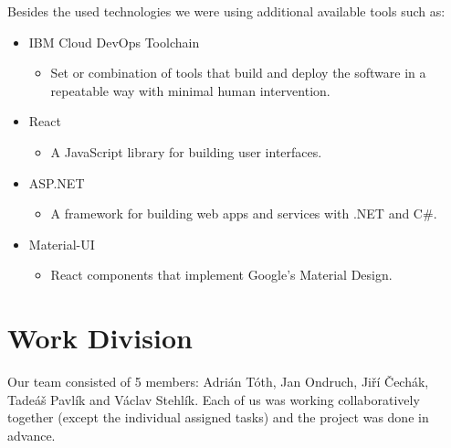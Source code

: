 \documentclass[11pt,a4paper]{article}
\begin{document}
Besides the used technologies we were using additional available tools such as:
\begin{itemize}
    \item IBM Cloud DevOps Toolchain
    \begin{itemize}
        \item Set or combination of tools that build and deploy the software in a repeatable way with minimal human intervention.
    \end{itemize}

    \item React
    \begin{itemize}
        \item A JavaScript library for building user interfaces.
    \end{itemize}

    \item ASP.NET
    \begin{itemize}
        \item A framework for building web apps and services with .NET and C\#.
    \end{itemize}

    \item Material-UI
    \begin{itemize}
        \item React components that implement Google's Material Design.
    \end{itemize}
\end{itemize}

\section{Work Division}

Our team consisted of 5 members: Adrián Tóth, Jan Ondruch, Jiří Čechák, Tadeáš Pavlík and Václav Stehlík. Each of us was working collaboratively together (except the individual assigned tasks) and the project was done in advance.\\[-3mm]
\end{document}
